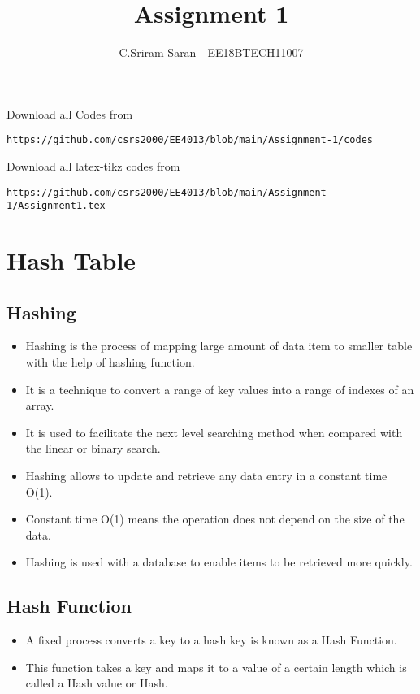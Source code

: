 \documentclass[journal,12pt,twocolumn]{IEEEtran}
\begin{document}
     \def\rightbox#1{\makebox[0in][r]{#1}}
     \def\centbox#1{\makebox[0in]{#1}}
     \def\topbox#1{\raisebox{-\baselineskip}[0in][0in]{#1}}
     \def\midbox#1{\raisebox{-0.5\baselineskip}[0in][0in]{#1}}
\vspace{3cm}
\title{Assignment 1}
\author{C.Sriram Saran - EE18BTECH11007}
\maketitle
\newpage
\bigskip
\renewcommand{\thefigure}{\theenumi}
\renewcommand{\thetable}{\theenumi}
Download all Codes from 
%
\begin{lstlisting}
https://github.com/csrs2000/EE4013/blob/main/Assignment-1/codes
\end{lstlisting}
Download all latex-tikz codes from 
\begin{lstlisting}
https://github.com/csrs2000/EE4013/blob/main/Assignment-1/Assignment1.tex
\end{lstlisting}
\section{\textbf{Hash Table}}
\subsection{\textbf{Hashing}}
\begin{itemize}
\item Hashing is the process of mapping large amount of data item to smaller table with the help of hashing function.
\item It is a technique to convert a range of key values into a range of indexes of an array.
\item It is used to facilitate the next level searching method when compared with the linear or binary search.
\item Hashing allows to update and retrieve any data entry in a constant time O(1).
\item Constant time O(1) means the operation does not depend on the size of the data.
\item Hashing is used with a database to enable items to be retrieved more quickly.
\end{itemize}
\subsection{\textbf{Hash Function}}
\begin{itemize}
\item A fixed process converts a key to a hash key is known as a Hash Function.
\item This function takes a key and maps it to a value of a certain length which is called a Hash value or Hash.
\end{itemize}
\end{document}
